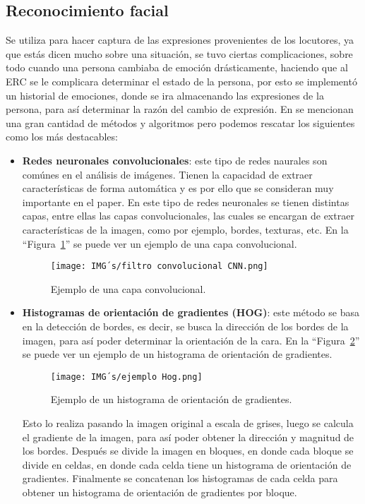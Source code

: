 \documentclass[12pt, conference]{IEEEtran}
\begin{document}
\subsection{Reconocimiento facial}
Se utiliza para hacer captura de las expresiones provenientes de los locutores, ya que estás dicen mucho sobre una situación, se tuvo ciertas complicaciones, sobre todo cuando una persona cambiaba de emoción drásticamente, haciendo que al ERC se le complicara determinar el estado de la persona, por esto se implementó un historial de emociones, donde se ira almacenando las expresiones de la persona, para así determinar la razón del cambio de expresión. En \cite{f13} se mencionan una gran cantidad de métodos y algoritmos pero podemos rescatar los siguientes como los más destacables:

\begin{itemize}
  \item \textbf{Redes neuronales convolucionales}: este tipo de redes naurales son comúnes en el análisis de imágenes. Tienen la capacidad de extraer características de forma automática y es por ello que se consideran muy importante en el paper. En este tipo de redes neuronales se tienen distintas capas, entre ellas las capas convolucionales, las cuales se encargan de extraer características de la imagen, como por ejemplo, bordes, texturas, etc. En la ``Figura~\ref{fig11}'' se puede ver un ejemplo de una capa convolucional.
  \begin{figure}[htbp]
    \caption{Ejemplo de una capa convolucional.}
    \centerline{\texttt{[image: IMG´s/filtro convolucional CNN.png]}}
    \label{fig11}
  \end{figure}
  \item \textbf{Histogramas de orientación de gradientes (HOG)}: este método se basa en la detección de bordes, es decir, se busca la dirección de los bordes de la imagen, para así poder determinar la orientación de la cara. En la ``Figura~\ref{fig12}'' se puede ver un ejemplo de un histograma de orientación de gradientes.
  \begin{figure}
    \caption{Ejemplo de un histograma de orientación de gradientes.}
    \centerline{\texttt{[image: IMG´s/ejemplo Hog.png]}}
    \label{fig12}
  \end{figure}
  Esto lo realiza pasando la imagen original a escala de grises, luego se calcula el gradiente de la imagen, para así poder obtener la dirección y magnitud de los bordes. Después se divide la imagen en bloques, en donde cada bloque se divide en celdas, en donde cada celda tiene un histograma de orientación de gradientes. Finalmente se concatenan los histogramas de cada celda para obtener un histograma de orientación de gradientes por bloque.

\end{itemize}
\end{document}
